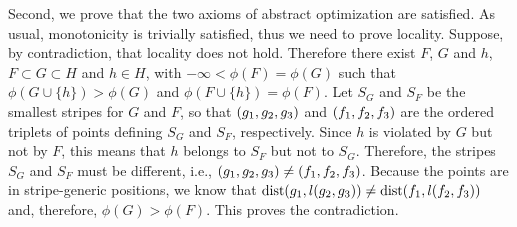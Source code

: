 \documentclass[onecolumn,journal,letterpaper]{IEEEtran}
\newcommand{\subscr}[2]{{#1}_{\textup{#2}}}
\newcommand{\union}{\cup}
\newcommand{\dist}{\operatorname{dist}}
\begin{document}
Second, we prove that the two axioms of abstract optimization are
satisfied.  As usual, monotonicity is trivially satisfied, thus we need to
prove locality.
Suppose, by contradiction, that locality does not hold. Therefore there
exist $F$, $G$ and $h$, $F\subset G\subset H$ and $h\in H$, with
$-\infty<\phi(F) = \phi(G)$ such that $\phi(G \union \{h\})>\phi(G)$ and
$\phi(F\union\{h\}) = \phi(F)$.
Let $S_G$ and $S_F$ be the smallest stripes for $G$ and $F$, so that
$(\subscr{g}{1},\subscr{g}{2},\subscr{g}{3})$ and
$(\subscr{f}{1},\subscr{f}{2},\subscr{f}{3})$ are the ordered triplets of
points defining $S_G$ and $S_F$, respectively.
Since $h$ is violated by $G$ but not by $F$, this means that $h$ belongs to
$S_F$ but not to $S_G$. Therefore, the stripes $S_G$ and $S_F$ must be
different, i.e., $(\subscr{g}{1},\subscr{g}{2},\subscr{g}{3}) \neq
(\subscr{f}{1},\subscr{f}{2},\subscr{f}{3})$.
Because the points are in stripe-generic positions, we know that
$\dist(\subscr{g}{1},l(\subscr{g}{2},\subscr{g}{3})) \neq
\dist(\subscr{f}{1},l(\subscr{f}{2},\subscr{f}{3}))$ and, therefore,
$\phi(G)>\phi(F)$. This proves the contradiction.
\end{document}
